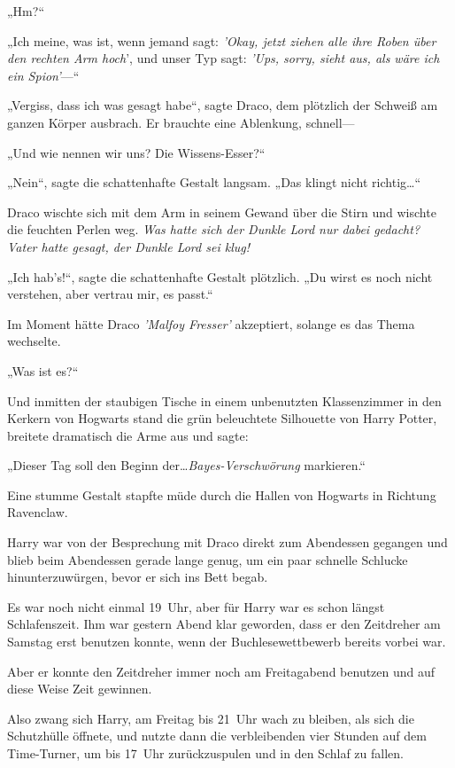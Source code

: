 {„Hm?“

„Ich meine, was ist, wenn jemand sagt: \emph{'Okay, jetzt ziehen alle ihre Roben über den rechten Arm hoch}', und unser Typ sagt: \emph{'Ups, sorry, sieht aus, als wäre ich ein Spion'}—“

„Vergiss, dass ich was gesagt habe“, sagte Draco, dem plötzlich der Schweiß am ganzen Körper ausbrach. Er brauchte eine Ablenkung, schnell—

„Und wie nennen wir uns? Die Wissens-Esser?“

„Nein“, sagte die schattenhafte Gestalt langsam. „Das klingt nicht richtig…“

Draco wischte sich mit dem Arm in seinem Gewand über die Stirn und wischte die feuchten Perlen weg. \emph{Was hatte sich der Dunkle Lord nur dabei gedacht? Vater hatte gesagt, der Dunkle Lord sei klug!}

„Ich hab's!“, sagte die schattenhafte Gestalt plötzlich. „Du wirst es noch nicht verstehen, aber vertrau mir, es passt.“

Im Moment hätte Draco \emph{'Malfoy Fresser'} akzeptiert, solange es das Thema wechselte.

„Was ist es?“

Und inmitten der staubigen Tische in einem unbenutzten Klassenzimmer in den Kerkern von Hogwarts stand die grün beleuchtete Silhouette von Harry Potter, breitete dramatisch die Arme aus und sagte:

„Dieser Tag soll den Beginn der…\emph{Bayes-Verschwörung} markieren.“

Eine stumme Gestalt stapfte müde durch die Hallen von Hogwarts in Richtung Ravenclaw.

Harry war von der Besprechung mit Draco direkt zum Abendessen gegangen und blieb beim Abendessen gerade lange genug, um ein paar schnelle Schlucke hinunterzuwürgen, bevor er sich ins Bett begab.

Es war noch nicht einmal 19~Uhr, aber für Harry war es schon längst Schlafenszeit. Ihm war gestern Abend klar geworden, dass er den Zeitdreher am Samstag erst benutzen konnte, wenn der Buchlesewettbewerb bereits vorbei war.

Aber er konnte den Zeitdreher immer noch am Freitagabend benutzen und auf diese Weise Zeit gewinnen.

Also zwang sich Harry, am Freitag bis 21~Uhr wach zu bleiben, als sich die Schutzhülle öffnete, und nutzte dann die verbleibenden vier Stunden auf dem Time-Turner, um bis 17~Uhr zurückzuspulen und in den Schlaf zu fallen.

}
